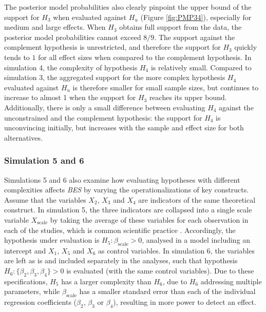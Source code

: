\documentclass[review, 3p, authoryear]{elsarticle} %
\begin{document}
The posterior model probabilities also clearly pinpoint the upper bound of the support for \(H_3\) when evaluated against \(H_u\) (Figure \ref{fig:PMP34}), especially for medium and large effects.
When \(H_3\) obtains full support from the data, the posterior model probabilities cannot exceed \(8/9\).
The support against the complement hypothesis is unrestricted, and therefore the support for \(H_3\) quickly tends to \(1\) for all effect sizes when compared to the complement hypothesis.
In simulation 4, the complexity of hypothesis \(H_4\) is relatively small.
Compared to simulation 3, the aggregated support for the more complex hypothesis \(H_4\) evaluated against \(H_u\) is therefore smaller for small sample sizes, but continues to increase to almost 1 when the support for \(H_3\) reaches its upper bound.
Additionally, there is only a small difference between evaluating \(H_4\) against the unconstrained and the complement hypothesis: the support for \(H_4\) is unconvincing initially, but increases with the sample and effect size for both alternatives.

\hypertarget{simulation-5-and-6}{%
\subsubsection{Simulation 5 and 6}\label{simulation-5-and-6}}

Simulations 5 and 6 also examine how evaluating hypotheses with different complexities affects \emph{BES} by varying the operationalizations of key constructs.
Assume that the variables \(X_2\), \(X_3\) and \(X_4\) are indicators of the same theoretical construct.
In simulation 5, the three indicators are collapsed into a single scale variable \(X_{\text{scale}}\) by taking the average of these variables for each observation in each of the studies, which is common scientific practice \citep{bauer_discrepancy_2016}.
Accordingly, the hypothesis under evaluation is \(H_5: \beta_{\text{scale}} > 0\), analysed in a model including an intercept and \(X_1\), \(X_5\) and \(X_6\) as control variables.
In simulation 6, the variables are left as is and included separately in the analyses, such that hypothesis \(H_6: \{\beta_2,\beta_3,\beta_4\} > 0\) is evaluated (with the same control variables).
Due to these specifications, \(H_5\) has a larger complexity than \(H_6\), due to \(H_6\) addressing multiple parameters, while \(\beta_{\text{scale}}\) has a smaller standard error than each of the individual regression coefficients (\(\beta_2\), \(\beta_3\) or \(\beta_4\)), resulting in more power to detect an effect.
\end{document}

